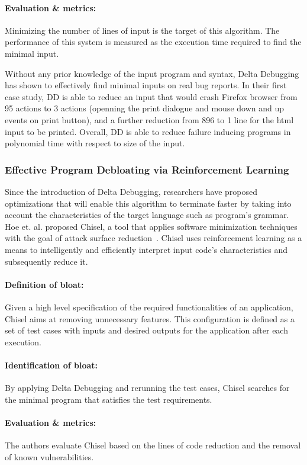 \paragraph{Evaluation \& metrics:} Minimizing the number of lines of input is the target of this algorithm. The performance of this system is measured as the execution time required to find the minimal input.

Without any prior knowledge of the input program and syntax, Delta Debugging has shown to effectively find minimal inputs on real bug reports. In their first case study, DD is able to reduce an input that would crash Firefox browser from 95 actions to 3 actions (openning the print dialogue and mouse down and up events on print button), and a further reduction from 896 to 1 line for the html input to be printed. Overall, DD is able to reduce failure inducing programs in polynomial time with respect to size of the input.

\subsubsection{Effective Program Debloating via Reinforcement Learning}
Since the introduction of Delta Debugging, researchers have proposed optimizations that will enable this algorithm to terminate faster by taking into account the characteristics of the target language such as program's grammar. Hoe et. al. proposed Chisel, a tool that applies software minimization techniques with the goal of attack surface reduction~\cite{heo2018effective}. Chisel uses reinforcement learning as a means to intelligently and efficiently interpret input code's characteristics and subsequently reduce it.

\paragraph{Definition of bloat:} Given a high level specification of the required functionalities of an application, Chisel aims at removing unnecessary features. This configuration is defined as a set of test cases with inputs and desired outputs for the application after each execution.
\paragraph{Identification of bloat:} By applying Delta Debugging and rerunning the test cases, Chisel searches for the minimal program that satisfies the test requirements.
\paragraph{Evaluation \& metrics:} The authors evaluate Chisel based on the lines of code reduction and the removal of known vulnerabilities.

